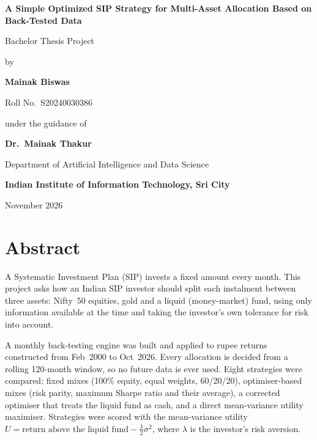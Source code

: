 \documentclass[11pt,a4paper]{article}
\newcommand{\studentname}{Mainak Biswas}
\newcommand{\rollno}{S20240030386}
\newcommand{\department}{Department of Artificial Intelligence and Data Science}
\newcommand{\college}{Indian Institute of Information Technology, Sri City}
\newcommand{\guide}{Dr.\ Mainak Thakur}
\newcommand{\submissiondate}{November 2026}
\newcommand{\reporttitle}{A Simple Optimized SIP Strategy for Multi-Asset Allocation Based on Back-Tested Data}
\begin{document}
\begin{titlepage}
  \thispagestyle{empty}
  \centering
  \vspace*{0.5cm}
  {\LARGE\bfseries \reporttitle\par}
  \vspace{1.2cm}
  {\Large Bachelor Thesis Project\par}
  \vspace{1.2cm}
  {by\par}
  \vspace{0.3cm}
  {\Large\bfseries \studentname\par}
  {\large Roll No.\ \rollno\par}
  \vspace{1.2cm}
  {under the guidance of\par}
  \vspace{0.3cm}
  {\Large\bfseries \guide\par}
  \vfill
  {\large \department\par}
  {\large\bfseries \college\par}
  \vspace{0.3cm}
  {\large \submissiondate\par}
\end{titlepage}


\section*{Abstract}
A Systematic Investment Plan (SIP) invests a fixed amount every month. This project asks how an
Indian SIP investor should split each instalment between three assets: Nifty~50 equities, gold
and a liquid (money-market) fund, using only information available at the time and taking the
investor's own tolerance for risk into account.

A monthly back-testing engine was built and applied to rupee returns constructed from
Feb~2000 to Oct~2026. Every allocation is decided from a rolling 120-month window, so no future
data is ever used. Eight strategies were compared: fixed mixes (100\% equity, equal weights,
60/20/20), optimiser-based mixes (risk parity, maximum Sharpe ratio and their average), a
corrected optimiser that treats the liquid fund as cash, and a direct mean-variance utility
maximiser. Strategies were scored with the mean-variance utility
$U = \text{return above the liquid fund} - \tfrac{\lambda}{2}\sigma^2$, where $\lambda$ is the
investor's risk aversion.
\end{document}
